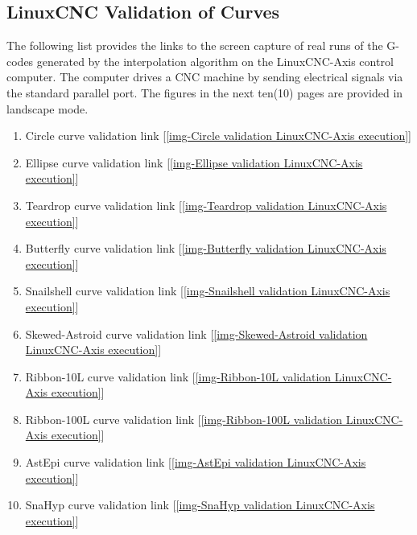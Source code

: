 \clearpage
\pagebreak

\subsection{LinuxCNC Validation of Curves}\label{LinuxCNC Validation of Curves}

The following list provides the links to the screen capture of real runs of the G-codes generated by the interpolation algorithm on the LinuxCNC-Axis control computer. The computer drives a CNC machine by sending electrical signals via the standard parallel port. The figures in the next ten(10) pages are provided in landscape mode.


\begin{enumerate}
	\item Circle curve validation link [\ref{img-Circle validation LinuxCNC-Axis execution}]
	\item Ellipse curve validation link  [\ref{img-Ellipse validation LinuxCNC-Axis execution}]
	\item Teardrop curve validation link  [\ref{img-Teardrop validation LinuxCNC-Axis execution}]
	\item Butterfly curve validation link  [\ref{img-Butterfly validation LinuxCNC-Axis execution}]
	\item Snailshell curve validation link [\ref{img-Snailshell validation LinuxCNC-Axis execution}]
	\item Skewed-Astroid curve validation link  [\ref{img-Skewed-Astroid validation LinuxCNC-Axis execution}]
	\item Ribbon-10L curve validation link  [\ref{img-Ribbon-10L validation LinuxCNC-Axis execution}]
	\item Ribbon-100L curve validation link  [\ref{img-Ribbon-100L validation LinuxCNC-Axis execution}]
	\item AstEpi curve validation link [\ref{img-AstEpi validation LinuxCNC-Axis execution}]
	\item SnaHyp curve validation link [\ref{img-SnaHyp validation LinuxCNC-Axis execution}]
\end{enumerate}


